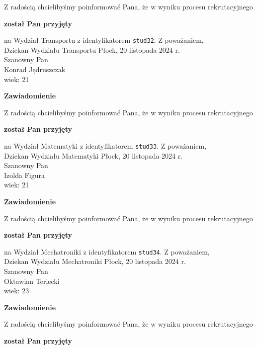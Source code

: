 \documentclass[12pt,a4paper]{article}
\begin{document}
\bigskip
Z radością chcielibyśmy poinformować Pana, że w wyniku procesu rekrutacyjnego 
\begin{center}
\textsf{\textbf{został Pan przyjęty}} 
\end{center}
na Wydział Transportu z identyfikatorem \verb|stud32|. 
\vspace{2cm}
\noindent
Z poważaniem,\\
Dziekan
Wydziału Transportu
\newpage
\hfill Płock, 20 listopada 2024 r.\\
\noindent 
Szanowny Pan \\
Konrad Jędruszczak \\
wiek: 21
\bigskip
\begin{center}
 	{\Large\textbf{Zawiadomienie}}
\end{center}
\bigskip
Z radością chcielibyśmy poinformować Pana, że w wyniku procesu rekrutacyjnego 
\begin{center}
\textsf{\textbf{został Pan przyjęty}} 
\end{center}
na Wydział Matematyki z identyfikatorem \verb|stud33|. 
\vspace{2cm}
\noindent
Z poważaniem,\\
Dziekan
Wydziału Matematyki
\newpage
\hfill Płock, 20 listopada 2024 r.\\
\noindent 
Szanowny Pan \\
Izolda Figura \\
wiek: 21
\bigskip
\begin{center}
 	{\Large\textbf{Zawiadomienie}}
\end{center}
\bigskip
Z radością chcielibyśmy poinformować Pana, że w wyniku procesu rekrutacyjnego 
\begin{center}
\textsf{\textbf{został Pan przyjęty}} 
\end{center}
na Wydział Mechatroniki z identyfikatorem \verb|stud34|. 
\vspace{2cm}
\noindent
Z poważaniem,\\
Dziekan
Wydziału Mechatroniki
\newpage
\hfill Płock, 20 listopada 2024 r.\\
\noindent 
Szanowny Pan \\
Oktawian Terlecki \\
wiek: 23
\bigskip
\begin{center}
 	{\Large\textbf{Zawiadomienie}}
\end{center}
\bigskip
Z radością chcielibyśmy poinformować Pana, że w wyniku procesu rekrutacyjnego 
\begin{center}
\textsf{\textbf{został Pan przyjęty}} 
\end{center}
\end{document}
